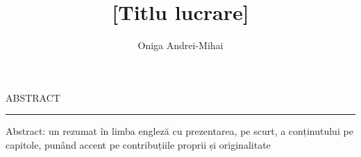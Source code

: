 \documentclass[12pt]{scrreport}
\begin{document}
\title{[Titlu lucrare]}					   
\author{Oniga Andrei-Mihai}											
				
\maketitle


\newpage
\thispagestyle{empty}
\mbox{}
\newpage
{}

\cleardoublepage
ABSTRACT
\vspace{0.5cm}	
\hrule
\vspace{0.5cm}	

Abstract: un rezumat în limba engleză cu prezentarea, pe scurt, a conținutului pe capitole, punând accent pe contribuțiile proprii și originalitate

\tableofcontents

\newpage
{}










\end{document}
